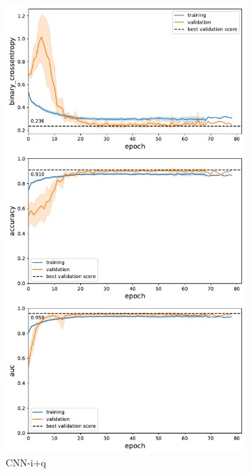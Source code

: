 \documentclass[fleqn,10pt]{wlscirep}
\begin{document}
\begin{figure}[tbp]
    \begin{subfigure}[t]{0.5\textwidth}
    \centering
    \includegraphics[width=0.9\linewidth]{deep-learning-qc/dl_learning_curve_with_qc.pdf}
    \caption{CNN-i+q}
    \label{fig:dl-loss:both}
    \end{subfigure}
    \begin{subfigure}[t]{0.5\textwidth}
    \centering

\end{subfigure}
\end{figure}
\end{document}
